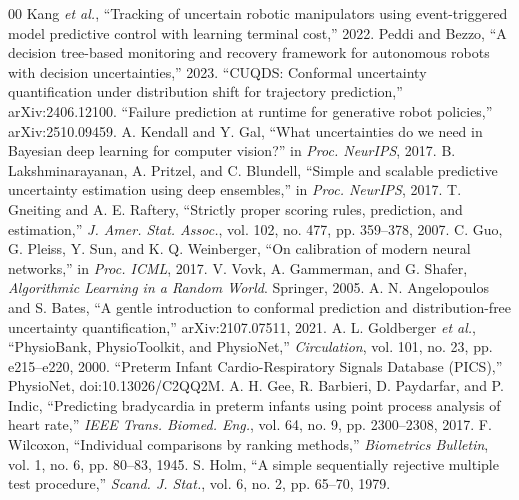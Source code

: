 \documentclass[conference]{IEEEtran}
\begin{document}
{\begin{thebibliography}{00}
 Kang \emph{et al.}, ``Tracking of uncertain robotic manipulators using event-triggered model predictive control with learning terminal cost,'' 2022.
 Peddi and Bezzo, ``A decision tree-based monitoring and recovery framework for autonomous robots with decision uncertainties,'' 2023.
 ``CUQDS: Conformal uncertainty quantification under distribution shift for trajectory prediction,'' arXiv:2406.12100.
 ``Failure prediction at runtime for generative robot policies,'' arXiv:2510.09459.
 A. Kendall and Y. Gal, ``What uncertainties do we need in Bayesian deep learning for computer vision?'' in \emph{Proc. NeurIPS}, 2017.
 B. Lakshminarayanan, A. Pritzel, and C. Blundell, ``Simple and scalable predictive uncertainty estimation using deep ensembles,'' in \emph{Proc. NeurIPS}, 2017.
 T. Gneiting and A. E. Raftery, ``Strictly proper scoring rules, prediction, and estimation,'' \emph{J. Amer. Stat. Assoc.}, vol. 102, no. 477, pp. 359--378, 2007.
 C. Guo, G. Pleiss, Y. Sun, and K. Q. Weinberger, ``On calibration of modern neural networks,'' in \emph{Proc. ICML}, 2017.
 V. Vovk, A. Gammerman, and G. Shafer, \emph{Algorithmic Learning in a Random World}. Springer, 2005.
 A. N. Angelopoulos and S. Bates, ``A gentle introduction to conformal prediction and distribution-free uncertainty quantification,'' arXiv:2107.07511, 2021.
 A. L. Goldberger \emph{et al.}, ``PhysioBank, PhysioToolkit, and PhysioNet,'' \emph{Circulation}, vol. 101, no. 23, pp. e215--e220, 2000.
 ``Preterm Infant Cardio-Respiratory Signals Database (PICS),'' PhysioNet, doi:10.13026/C2QQ2M.
 A. H. Gee, R. Barbieri, D. Paydarfar, and P. Indic, ``Predicting bradycardia in preterm infants using point process analysis of heart rate,'' \emph{IEEE Trans. Biomed. Eng.}, vol. 64, no. 9, pp. 2300--2308, 2017.
 F. Wilcoxon, ``Individual comparisons by ranking methods,'' \emph{Biometrics Bulletin}, vol. 1, no. 6, pp. 80--83, 1945.
 S. Holm, ``A simple sequentially rejective multiple test procedure,'' \emph{Scand. J. Stat.}, vol. 6, no. 2, pp. 65--70, 1979.
\end{thebibliography}}
\end{document}
